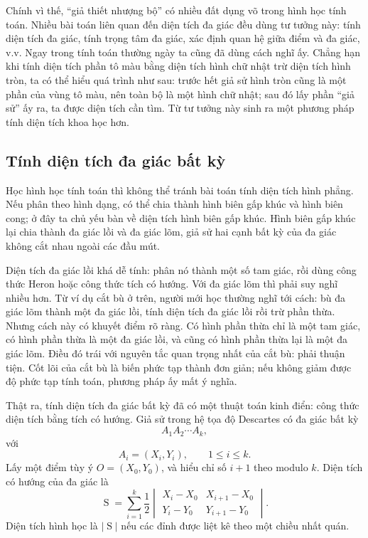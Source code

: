 \documentclass[11pt]{article}
\newcommand{\sgnarea}{\operatorname{S}}
\begin{document}
Chính vì thế, ``giả thiết nhượng bộ'' có nhiều đất dụng võ trong hình học tính
toán. Nhiều bài toán liên quan đến diện tích đa giác đều dùng tư tưởng này:
tính diện tích đa giác, tính trọng tâm đa giác, xác định quan hệ giữa điểm và
đa giác, v.v. Ngay trong tính toán thường ngày ta cũng đã dùng cách nghĩ ấy.
Chẳng hạn khi tính diện tích phần tô màu bằng diện tích hình chữ nhật trừ diện
tích hình tròn, ta có thể hiểu quá trình như sau: trước hết giả sử hình tròn
cũng là một phần của vùng tô màu, nên toàn bộ là một hình chữ nhật; sau đó lấy
phần ``giả sử'' ấy ra, ta được diện tích cần tìm. Từ tư tưởng này sinh ra một
phương pháp tính diện tích khoa học hơn.

\subsection{Tính diện tích đa giác bất kỳ}

Học hình học tính toán thì không thể tránh bài toán tính diện tích hình phẳng.
Nếu phân theo hình dạng, có thể chia thành hình biên gấp khúc và hình biên
cong; ở đây ta chủ yếu bàn về diện tích hình biên gấp khúc. Hình biên gấp khúc
lại chia thành đa giác lồi và đa giác lõm, giả sử hai cạnh bất kỳ của đa giác
không cắt nhau ngoài các đầu mút.

Diện tích đa giác lồi khá dễ tính: phân nó thành một số tam giác, rồi dùng công
thức Heron hoặc công thức tích có hướng. Với đa giác lõm thì phải suy nghĩ
nhiều hơn. Từ ví dụ cắt bù ở trên, người mới học thường nghĩ tới cách: bù đa
giác lõm thành một đa giác lồi, tính diện tích đa giác lồi rồi trừ phần thừa.
Nhưng cách này có khuyết điểm rõ ràng. Có hình phần thừa chỉ là một tam giác,
có hình phần thừa là một đa giác lồi, và cũng có hình phần thừa lại là một đa
giác lõm. Điều đó trái với nguyên tắc quan trọng nhất của cắt bù: phải thuận
tiện. Cốt lõi của cắt bù là biến phức tạp thành đơn giản; nếu không giảm được
độ phức tạp tính toán, phương pháp ấy mất ý nghĩa.

Thật ra, tính diện tích đa giác bất kỳ đã có một thuật toán kinh điển: công
thức diện tích bằng tích có hướng. Giả sử trong hệ tọa độ Descartes có đa giác
bất kỳ
\[
  A_1A_2\cdots A_k,
\]
với
\[
  A_i=(X_i,Y_i),\qquad 1\le i\le k.
\]
Lấy một điểm tùy ý $O=(X_0,Y_0)$, và hiểu chỉ số $i+1$ theo modulo $k$. Diện
tích có hướng của đa giác là
\[
  \sgnarea =
  \sum_{i=1}^{k}
  \frac12
  \begin{vmatrix}
    X_i-X_0 & X_{i+1}-X_0\\
    Y_i-Y_0 & Y_{i+1}-Y_0
  \end{vmatrix}.
\]
Diện tích hình học là $|\sgnarea|$ nếu các đỉnh được liệt kê theo một chiều
nhất quán.
\end{document}
